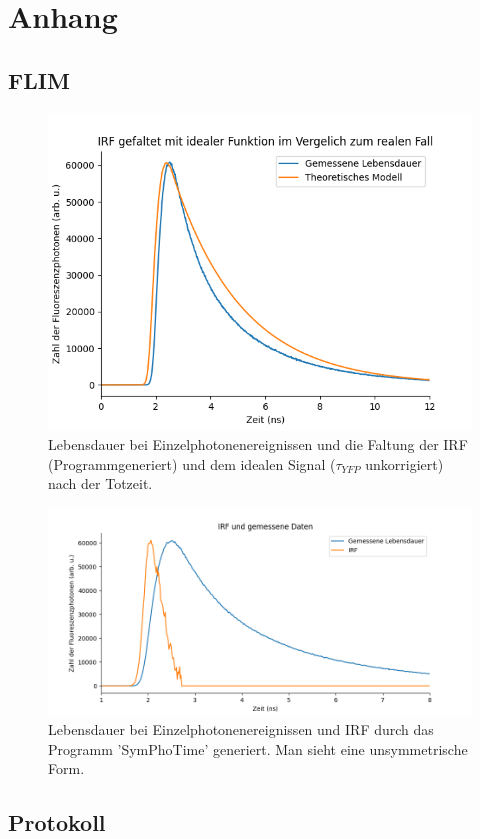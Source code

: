 

\chapter{Anhang}
\label{chap:anhangA}
\section{FLIM}

\begin{figure}[h]
    \centering
    \includegraphics[width = \linewidth]{Bilder/Auswertung/IRFProgConvol.png}
    \caption{Lebensdauer bei Einzelphotonenereignissen und die Faltung der IRF (Programmgeneriert) und dem idealen Signal ($\tau_{YFP}$ unkorrigiert) nach der Totzeit. }
    \label{bild:IRFconvProg}
\end{figure}


\begin{figure}[h]
    \centering
    \includegraphics[width = \linewidth]{Bilder/Auswertung/IRFProg.png}
    \caption{ Lebensdauer bei Einzelphotonenereignissen und IRF durch das Programm 'SymPhoTime' generiert. Man sieht eine unsymmetrische Form.}
    \label{bild:IRFProg}
\end{figure}



\clearpage
\section{Protokoll}
\label{section:Protokoll}

